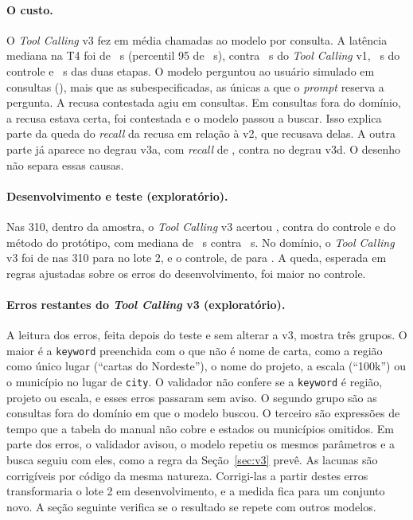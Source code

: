 \paragraph{O custo.} O \textit{Tool Calling} v3 fez em média  chamadas ao modelo por consulta. A latência mediana na T4 foi de ~s (percentil 95 de ~s), contra ~s do \textit{Tool Calling} v1, ~s do controle e ~s das duas etapas. O modelo perguntou ao usuário simulado em  consultas (), mais que as  subespecificadas, as únicas a que o \textit{prompt} reserva a pergunta. A recusa contestada agiu em  consultas. Em  consultas fora do domínio, a recusa estava certa, foi contestada e o modelo passou a buscar. Isso explica parte da queda do \textit{recall} da recusa em relação à v2, que recusava  delas. A outra parte já aparece no degrau v3a, com \textit{recall} de , contra  no degrau v3d. O desenho não separa essas causas.

\paragraph{Desenvolvimento e teste (exploratório).} Nas 310, dentro da amostra, o \textit{Tool Calling} v3 acertou , contra  do controle e  do método do protótipo, com mediana de ~s contra ~s. No domínio, o \textit{Tool Calling} v3 foi de  nas 310 para  no lote 2, e o controle, de  para . A queda, esperada em regras ajustadas sobre os erros do desenvolvimento, foi maior no controle.

\paragraph{Erros restantes do \textit{Tool Calling} v3 (exploratório).} A leitura dos erros, feita depois do teste e sem alterar a v3, mostra três grupos. O maior é a \texttt{keyword} preenchida com o que não é nome de carta, como a região como único lugar (``cartas do Nordeste''), o nome do projeto, a escala (``100k'') ou o município no lugar de \texttt{city}. O validador não confere se a \texttt{keyword} é região, projeto ou escala, e esses erros passaram sem aviso. O segundo grupo são as consultas fora do domínio em que o modelo buscou. O terceiro são expressões de tempo que a tabela do manual não cobre e estados ou municípios omitidos. Em parte dos erros, o validador avisou, o modelo repetiu os mesmos parâmetros e a busca seguiu com eles, como a regra da Seção~\ref{sec:v3} prevê. As lacunas são corrigíveis por código da mesma natureza. Corrigi-las a partir destes erros transformaria o lote 2 em desenvolvimento, e a medida fica para um conjunto novo. A seção seguinte verifica se o resultado se repete com outros modelos.


